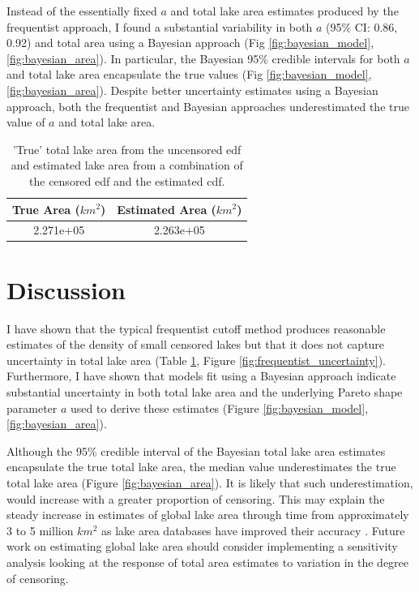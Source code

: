 \documentclass{article}
\begin{document}
Instead of the essentially fixed $a$ and total lake area estimates produced by the frequentist approach, I found a substantial variability in both $a$ (95\% CI: 0.86, 0.92) and total area using a Bayesian approach (Fig \ref{fig:bayesian_model}, \ref{fig:bayesian_area}). In particular, the Bayesian 95\% credible intervals for both $a$ and total lake area encapsulate the true values (Fig \ref{fig:bayesian_model}, \ref{fig:bayesian_area}). Despite better uncertainty estimates using a Bayesian approach, both the frequentist and Bayesian approaches underestimated the true value of $a$ and total lake area.

\begin{table}
	\caption{'True' total lake area from the uncensored edf and estimated lake area from a combination of the censored edf and the estimated cdf.}
	\centering
	\begin{tabular}{cc}
	\toprule
		True Area ($km^2$) & Estimated Area ($km^2$) \\
	\midrule
		2.271e+05 & 2.263e+05 \\
	\bottomrule
	\end{tabular}
	\label{tab:pred_table}
\end{table}

\section{Discussion}

I have shown that the typical frequentist cutoff method produces reasonable estimates of the density of small censored lakes but that it does not capture uncertainty in total lake area (Table \ref{tab:pred_table}, Figure \ref{fig:frequentist_uncertainty}). Furthermore, I have shown that models fit using a Bayesian approach indicate substantial uncertainty in both total lake area and the underlying Pareto shape parameter $a$ used to derive these estimates (Figure \ref{fig:bayesian_model}, \ref{fig:bayesian_area}).

Although the 95\% credible interval of the Bayesian total lake area estimates encapsulate the true total lake area, the median value underestimates the true total lake area (Figure \ref{fig:bayesian_area}). It is likely that such underestimation, would increase with a greater proportion of censoring. This may explain the steady increase in estimates of global lake area through time from approximately 3 to 5 million $km^{2}$ as lake area databases have improved their accuracy \citep{lehnerDevelopmentValidationGlobal2004, downingGlobalAbundanceSize2006, verpoorterGlobalInventoryLakes2014}. Future work on estimating global lake area should consider implementing a sensitivity analysis looking at the response of total area estimates to variation in the degree of censoring.
\end{document}
